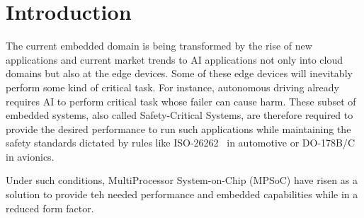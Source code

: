\section{Introduction}


The current embedded domain is being transformed by the rise of new applications and current market trends to AI applications not only into cloud domains but also at the edge devices. Some of these edge devices will inevitably perform some kind of critical task. For instance, autonomous driving already requires AI to perform critical task whose failer can cause harm. These subset of embedded systems, also called Safety-Critical Systems, are therefore required to provide the desired performance to run such applications while maintaining the safety standards dictated by rules like ISO-26262~\cite{ISO26262} in automotive or DO-178B/C~\cite{DO178BC} in avionics.



Under such conditions, MultiProcessor System-on-Chip (MPSoC) have risen as a solution to provide teh needed performance and embedded capabilities while in a reduced form factor.
